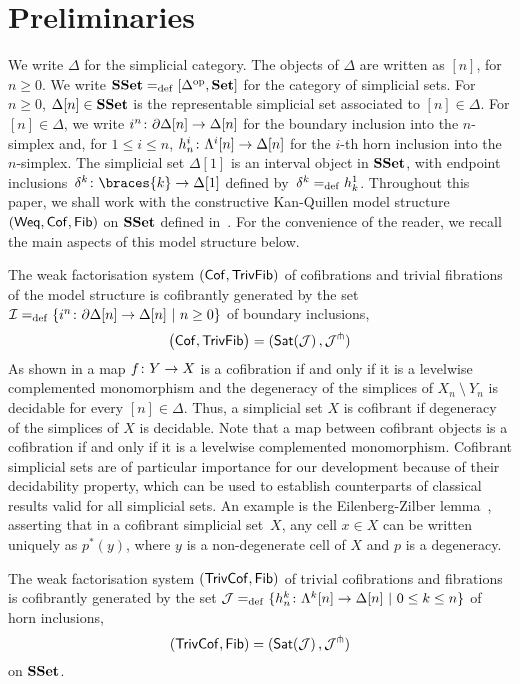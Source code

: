 \documentclass[reqno,10pt,a4paper,oneside,draft]{amsart}
\begin{document}
\section{Preliminaries} 
\label{sec:preliminaries}




We write $\Delta$ for the simplicial category. The objects of $\Delta$ are written as $[n]$, for $n \geq 0$.
We write $\mathbf{SSet} =_{\operatorname{def}} [\Delta^{\operatorname{op}}, \mathbf{Set}]$ for the category of simplicial sets. For $n \geq 0$, $\Delta[n] \in \mathbf{SSet}$ is the representable simplicial set associated to $[n] \in \Delta$. For $[n] \in \Delta$, we write $i^n \colon  \partial \Delta[n] \to \Delta[n]$ for the boundary inclusion into the $n$-simplex and, for $1 \leq i \leq n$,  
$h^i_n  \colon \Lambda^i[n] \to \Delta[n]$  for the $i$-th horn inclusion into the $n$-simplex. The simplicial set $\Delta[1]$ is an interval object in $\mathbf{SSet}$, with endpoint inclusions~$\kcyl \co \braces{ k} \to \Delta[1]$ defined by~$\delta^k =_{\operatorname{def}} h^1_k$. Throughout this paper, we shall work  with the constructive 
Kan-Quillen model structure $(\mathsf{Weq}, \mathsf{Cof}, \mathsf{Fib})$ on $\mathbf{SSet}$ defined in~\cite{henry2019qms}. 
For the convenience of the reader, we recall the main aspects of this model structure below.


The weak factorisation system $(\mathsf{Cof}, \mathsf{TrivFib})$ of cofibrations and trivial fibrations of the 
model structure is cofibrantly generated by the set $\mathcal{I} =_{\operatorname{def}} \{ i^n \colon  \partial \Delta[n] \to \Delta[n] \ | \ n \geq 0 \}$  of boundary 
inclusions, \ie 
\[
\big( \mathsf{Cof}, \mathsf{TrivFib} \big) = ( \mathsf{Sat}(\mathcal{J}) \, , \mathcal{J}^\pitchfork)
\]
As shown in \cite{henry2018wms} a map $f \colon Y \to X$ is a cofibration if  and only if 
it is a levelwise complemented monomorphism and the degeneracy of the simplices of $X_n ~\setminus~Y_n$ is decidable for every $[n] \in \Delta$. Thus, a simplicial set $X$ is
cofibrant if  degeneracy of the simplices of $X$ is decidable.
Note that a map between cofibrant objects is a cofibration
if and only if it is a levelwise complemented monomorphism. 
Cofibrant simplicial sets are of particular importance for our development because of their decidability property, which can be used to establish counterparts of classical results valid for all simplicial sets. An example is the Eilenberg-Zilber lemma~\cite{henry2018wms}, asserting that in a cofibrant simplicial set~$X$, any cell $x \in X$ can be written uniquely as $p^*(y)$, where $y$ is a non-degenerate cell of $X$ and $p$ is a degeneracy. 
\medskip

The weak factorisation system $(\mathsf{TrivCof}, \mathsf{Fib})$ of  trivial cofibrations and fibrations is cofibrantly 
generated by the set $\mathcal{J} =_{\operatorname{def}} \{ h^k_n  \colon \Lambda^k[n] \to \Delta[n]  \ | \ 0 \leq k \leq n \}$ of horn 
inclusions, \ie 
\[
(\mathsf{TrivCof}, \mathsf{Fib}) = ( \mathsf{Sat}(\mathcal{J}) \, , \mathcal{J}^\pitchfork)
\] 
on $\mathbf{SSet}$. 
\end{document}
